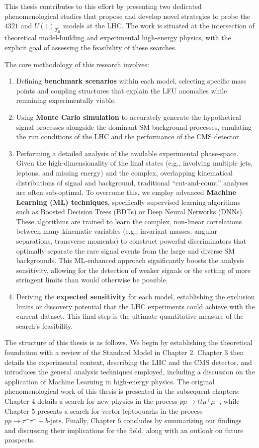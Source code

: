 This thesis contributes to this effort by presenting two dedicated phenomenological studies that propose and develop novel strategies to probe the $4321$ and $U(1)_{T^3_R}$ models at the LHC. The work is situated at the intersection of theoretical model-building and experimental high-energy physics, with the explicit goal of assessing the feasibility of these searches.

The core methodology of this research involves:
\begin{enumerate}
    \item Defining \textbf{benchmark scenarios} within each model, selecting specific mass points and coupling structures that explain the LFU anomalies while remaining experimentally viable.
    \item Using \textbf{Monte Carlo simulation} to accurately generate the hypothetical signal processes alongside the dominant SM background processes, emulating the run conditions of the LHC and the performance of the CMS detector.
    \item Performing a detailed analysis of the available experimental phase-space. Given the high-dimensionality of the final states (e.g., involving multiple jets, leptons, and missing energy) and the complex, overlapping kinematical distributions of signal and background, traditional ``cut-and-count'' analyses are often sub-optimal. To overcome this, we employ advanced \textbf{Machine Learning (ML) techniques}, specifically supervised learning algorithms such as Boosted Decision Trees (BDTs) or Deep Neural Networks (DNNs). These algorithms are trained to learn the complex, non-linear correlations between many kinematic variables (e.g., invariant masses, angular separations, transverse momenta) to construct powerful discriminators that optimally separate the rare signal events from the large and diverse SM backgrounds. This ML-enhanced approach significantly boosts the analysis sensitivity, allowing for the detection of weaker signals or the setting of more stringent limits than would otherwise be possible.
    \item Deriving the \textbf{expected sensitivity} for each model, establishing the exclusion limits or discovery potential that the LHC experiments could achieve with the current dataset. This final step is the ultimate quantitative measure of the search's feasibility.
\end{enumerate}

The structure of this thesis is as follows. We begin by establishing the theoretical foundation with a review of the Standard Model in Chapter 2. Chapter 3 then details the experimental context, describing the LHC and the CMS detector, and introduces the general analysis techniques employed, including a discussion on the application of Machine Learning in high-energy physics. The original phenomenological work of this thesis is presented in the subsequent chapters: Chapter 4 details a search for new physics in the process $pp \to t\bar{t}\mu^+\mu^-$, while Chapter 5 presents a search for vector leptoquarks in the process $pp \to \tau^+\tau^- + b\text{-jets}$. Finally, Chapter 6 concludes by summarizing our findings and discussing their implications for the field, along with an outlook on future prospects.

